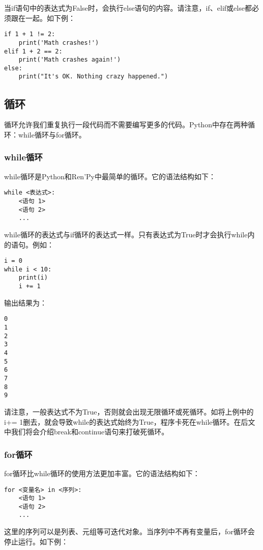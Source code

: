 当if语句中的表达式为False时，会执行else语句的内容。请注意，if、elif或else都必须跟在一起。如下例：

\begin{lstlisting}
if 1 + 1 != 2:
    print('Math crashes!')
elif 1 + 2 == 2:
    print('Math crashes again!')
else:
    print("It's OK. Nothing crazy happened.")
\end{lstlisting}

\subsection{循环}
循环允许我们重复执行一段代码而不需要编写更多的代码。Python中存在两种循环：while循环与for循环。

\subsubsection{while循环}
while循环是Python和Ren'Py中最简单的循环。它的语法结构如下：
\begin{lstlisting}
while <表达式>:
    <语句 1>
    <语句 2>
    ...
\end{lstlisting}

while循环的表达式与if循环的表达式一样。只有表达式为True时才会执行while内的语句。例如：

\begin{lstlisting}
i = 0
while i < 10:
    print(i)
    i += 1
\end{lstlisting}

输出结果为：
\begin{lstlisting}
0
1
2
3
4
5
6
7
8
9
\end{lstlisting}

\begin{Warning}
    请注意，一般表达式不为True，否则就会出现无限循环或死循环。如将上例中的i+= 1删去，就会导致while的表达式始终为True，程序卡死在while循环。在后文中我们将会介绍break和continue语句来打破死循环。
\end{Warning}

\subsubsection{for循环\PyOnly }
for循环比while循环的使用方法更加丰富。它的语法结构如下：
\begin{lstlisting}
for <变量名> in <序列>:
    <语句 1>
    <语句 2>
    ...
\end{lstlisting}

这里的序列可以是列表、元组等可迭代对象。当序列中不再有变量后，for循环会停止运行。如下例：

